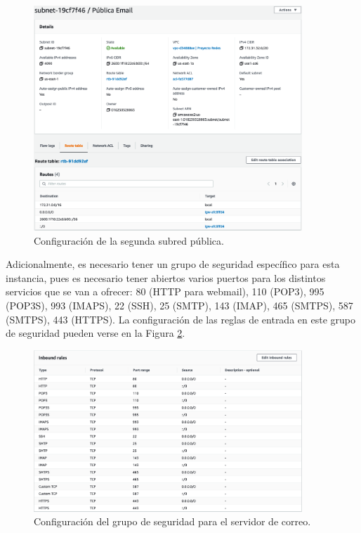 \documentclass{article}
\begin{document}
\begin{figure}[H]
  \centering
  \includegraphics[width=0.9\textwidth]{email/subred}
  \caption{Configuraci\'on de la segunda subred p\'ublica.}
  \label{fig:email-subred}
\end{figure}

Adicionalmente, es necesario tener un grupo de
seguridad espec\'ifico para esta instancia, pues
es necesario tener abiertos varios puertos para
los distintos servicios que se van a ofrecer:
80 (HTTP para webmail), 110 (POP3), 995 (POP3S),
993 (IMAPS), 22 (SSH), 25 (SMTP), 143 (IMAP),
465 (SMTPS), 587 (SMTPS), 443 (HTTPS).   La
configuraci\'on de las reglas de entrada en este
grupo de seguridad pueden verse en la Figura
\ref{fig:email-seguridad}.

\begin{figure}[H]
  \centering
  \includegraphics[width=0.9\textwidth]{email/seguridad}
  \caption{Configuraci\'on del grupo de seguridad para
           el servidor de correo.}
  \label{fig:email-seguridad}
\end{figure}
\end{document}

